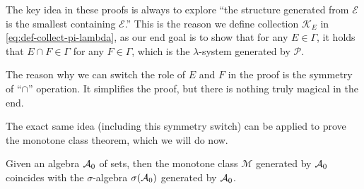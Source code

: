 The key idea in these proofs is always to explore ``the structure generated from $\mathcal E$ is the smallest containing $\mathcal E$.'' This is the reason we define collection $\mathcal K_E$ in \eqref{eq:def-collect-pi-lambda}, as our end goal is to show that for any $E \in \Gamma$, it holds that $E \cap F \in \Gamma$ for any $F \in \Gamma$, which is the $\lambda$-system generated by $\mathcal P$.

The reason why we can switch the role of $E$ and $F$ in the proof is the symmetry of ``$\cap$'' operation. It simplifies the proof, but there is nothing truly magical in the end.

The exact same idea (including this symmetry switch) can be applied to prove the monotone class theorem, which we will do now.

\begin{namedthm}
     Given an algebra $\mathcal{A}_0$ of sets, then the monotone class $\mathcal{M}$ generated by $\mathcal{A}_0$ coincides with the $\sigma$-algebra $\sigma(\mathcal{A}_0)$ generated by $\mathcal{A}_0$.
\end{namedthm}
    
